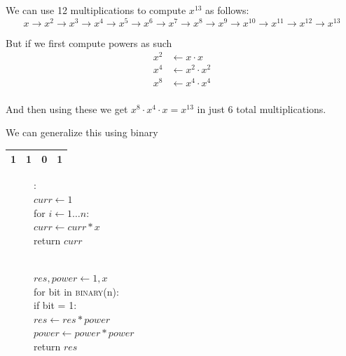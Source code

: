 \documentclass[aspectratio=169, handout]{beamer}
\begin{document}
\begin{frame}{}
    We can use 12 multiplications to compute $x^{13}$ as follows: 
    $$x \to x^2 \to x^3 \to x^4 \to x^5 \to x^6 \to x^7 \to x^8 \to x^9 \to x^{10} \to x^{11} \to x^{12} \to x^{13}$$ 
    
    \pause
    
    But if we first compute powers as such
    \begin{align*}
        x^2 &\gets x \cdot x \\
        x^4 &\gets x^2 \cdot x^2 \\ 
        x^8 &\gets x^4 \cdot x^4 \\
    \end{align*}
    
    \pause
    
    And then using these we get $x^8 \cdot x^4 \cdot x = x^{13}$ in just 6 total multiplications.
    
    \pause
    
    We can generalize this using binary    
    \begin{table}[]
    \begin{tabular}{|l|l|l|l|}
    \hline
    \textbf{1} & \textbf{1} & 0 & \textbf{1} \\ 
    \hline
    \end{tabular}
    \end{table}
\end{frame}


\begin{frame}{}
\begin{figure}[htbp]
 \begin{minipage}{0.5\linewidth}
  \centering
    \begin{algo}
        :\+
    \\  $curr \gets 1$
    \\  for $i \gets 1 \ldots n:$\+
    \\      $curr \gets curr * x$\-
    \\  return $curr$

    \end{algo}
 \end{minipage}%
 \pause %
 \begin{minipage}{0.5\linewidth}
  \centering
    \begin{algo}
        \+
    \\      $res, power \gets 1, x$
    \\      for bit in \textsc{binary}(n):\+
    \\          if bit = 1:\+
    \\              $res \gets res * power$\-
    \\          $power \gets power * power$\-
    \\      return $res$
    \end{algo}
 \end{minipage}
\end{figure} 

\end{frame}
\end{document}
